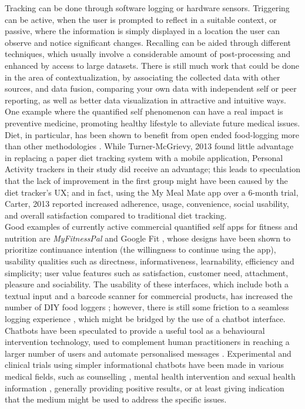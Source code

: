 Tracking can be done through software logging or hardware sensors. Triggering can be active, when the user is prompted to reflect in a suitable context, or passive, where the information is simply displayed in a location the user can observe and notice significant changes. Recalling can be aided through different techniques, which usually involve a considerable amount of post-processing and enhanced by access to large datasets. There is still much work that could be done in the area of contextualization, by associating the collected data with other sources, and data fusion, comparing your own data with independent self or peer reporting, as well as better data visualization in attractive and intuitive ways. \\
One example where the quantified self phenomenon can have a real impact is preventive medicine, promoting healthy lifestyle to alleviate future medical issues. Diet, in particular, has been shown to benefit from open ended food-logging more than other methodologies \cite{Bingham1994}. While Turner-McGrievy, 2013 \cite{Turner-McGrievy2013} found little advantage in replacing a paper diet tracking system with a mobile application, Personal Activity trackers in their study did receive an advantage; this leads to speculation that the lack of improvement in the first group might have been caused by the diet tracker's UX; and in fact, using the My Meal Mate app over a 6-month trial, Carter, 2013 \cite{carter2013adherence} reported increased adherence, usage, convenience, social usability, and overall satisfaction compared to traditional diet tracking. \\
Good examples of currently active commercial quantified self apps for fitness and nutrition are \textit{MyFitnessPal} \cite{mfpwebsite} and Google Fit \cite{googlefitwebsite}, whose designs have been shown \cite{Suzianti2017} to prioritize continuance intention (the willingness to continue using the app), usability qualities such as directness, informativeness, learnability, efficiency and simplicity; user value features such as satisfaction, customer need, attachment, pleasure and sociability. The usability of these interfaces, which include both a textual input and a barcode scanner for commercial products, has increased the number of DIY food loggers \cite{Alonso2015}; however, there is still some friction to a seamless logging experience \cite{Boushey2016}, which might be bridged by the use of a chatbot interface.  \\
Chatbots have been speculated to provide a useful tool as a behavioural intervention technology, used to complement human practitioners in reaching a larger number of users and automate personalised messages \cite{Gabrielli2017}. Experimental and clinical trials using simpler informational chatbots have been made in various medical fields, such as counselling \cite{Cameron}, mental health intervention \cite{Elmasri2012} and sexual health information \cite{Brixey2017}, generally providing positive results, or at least giving indication that the medium might be used to address the specific issues.
